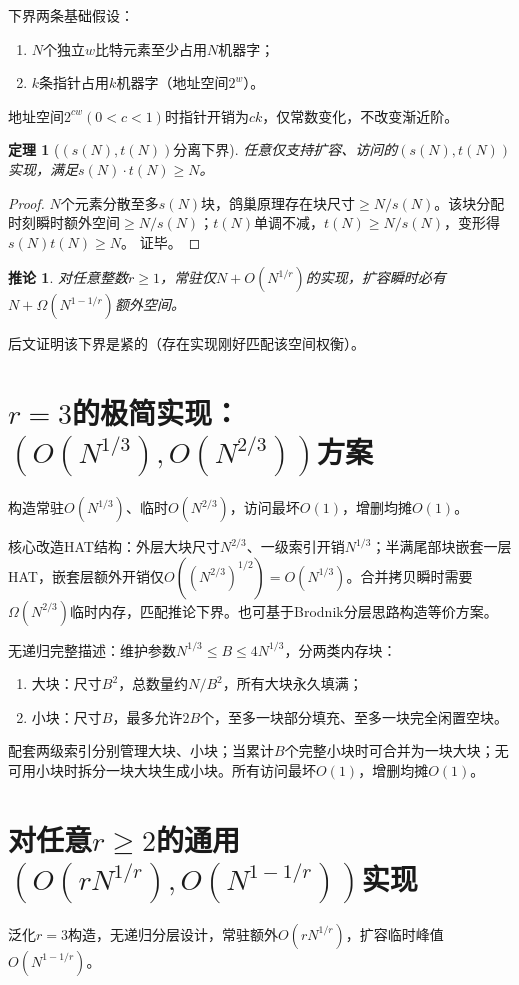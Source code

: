 \documentclass[11pt,a4paper]{article}
\newtheorem{thm}{定理}[section]
\newtheorem{cor}{推论}[section]
\begin{document}
下界两条基础假设：
\begin{enumerate}
    \item $N$个独立$w$比特元素至少占用$N$机器字；
    \item $k$条指针占用$k$机器字（地址空间$2^w$）。
\end{enumerate}
地址空间$2^{cw}(0<c<1)$时指针开销为$ck$，仅常数变化，不改变渐近阶。

\begin{thm}[$(s(N),t(N))$分离下界]
任意仅支持扩容、访问的$(s(N),t(N))$实现，满足$s(N)\cdot t(N)\ge N$。
\end{thm}
\begin{proof}
$N$个元素分散至多$s(N)$块，鸽巢原理存在块尺寸$\ge N/s(N)$。该块分配时刻瞬时额外空间$\ge N/s(N)$；$t(N)$单调不减，$t(N)\ge N/s(N)$，变形得$s(N)t(N)\ge N$。
证毕。
\end{proof}
\begin{cor}
对任意整数$r\ge1$，常驻仅$N+O(N^{1/r})$的实现，扩容瞬时必有$N+\Omega(N^{1-1/r})$额外空间。
\end{cor}
后文证明该下界是紧的（存在实现刚好匹配该空间权衡）。

\section{\texorpdfstring{$r=3$}{r=3}的极简实现：\texorpdfstring{$(O(N^{1/3}),O(N^{2/3}))$}{(O(N^1/3),O(N^2/3))}方案}
构造常驻$O(N^{1/3})$、临时$O(N^{2/3})$，访问最坏$O(1)$，增删均摊$O(1)$。

核心改造HAT结构：外层大块尺寸$N^{2/3}$、一级索引开销$N^{1/3}$；半满尾部块嵌套一层HAT，嵌套层额外开销仅$O((N^{2/3})^{1/2})=O(N^{1/3})$。合并拷贝瞬时需要$\Omega(N^{2/3})$临时内存，匹配推论下界。也可基于Brodnik分层思路构造等价方案。

无递归完整描述：维护参数$N^{1/3}\le B\le4N^{1/3}$，分两类内存块：
\begin{enumerate}
    \item 大块：尺寸$B^2$，总数量约$N/B^2$，所有大块永久填满；
    \item 小块：尺寸$B$，最多允许$2B$个，至多一块部分填充、至多一块完全闲置空块。
\end{enumerate}
配套两级索引分别管理大块、小块；当累计$B$个完整小块时可合并为一块大块；无可用小块时拆分一块大块生成小块。所有访问最坏$O(1)$，增删均摊$O(1)$。

\section{对任意\texorpdfstring{$r\ge2$}{r≥2}的通用\texorpdfstring{$(O(rN^{1/r}),O(N^{1-1/r}))$}{(O(rN^1/r),O(N^1-1/r))}实现}
泛化$r=3$构造，无递归分层设计，常驻额外$O(rN^{1/r})$，扩容临时峰值$O(N^{1-1/r})$。
\end{document}
